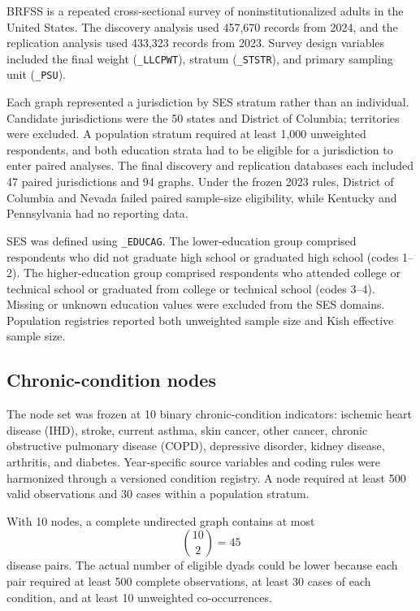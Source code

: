 \documentclass[11pt]{article}
\newcommand{\brfss}{\textsc{BRFSS}}
\begin{document}
\brfss{} is a repeated cross-sectional survey of noninstitutionalized adults
in the United States. The discovery analysis used 457,670 records from 2024,
and the replication analysis used 433,323 records from 2023. Survey design
variables included the final weight (\texttt{\_LLCPWT}), stratum
(\texttt{\_STSTR}), and primary sampling unit (\texttt{\_PSU}).

Each graph represented a jurisdiction by SES stratum rather than an
individual. Candidate jurisdictions were the 50 states and District of
Columbia; territories were excluded. A population stratum required at least
1,000 unweighted respondents, and both education strata had to be eligible for
a jurisdiction to enter paired analyses. The final discovery and replication
databases each included 47 paired jurisdictions and 94 graphs. Under the
frozen 2023 rules, District of Columbia and Nevada failed paired sample-size
eligibility, while Kentucky and Pennsylvania had no reporting data.

SES was defined using \texttt{\_EDUCAG}. The lower-education group comprised
respondents who did not graduate high school or graduated high school
(codes 1--2). The higher-education group comprised respondents who attended
college or technical school or graduated from college or technical school
(codes 3--4). Missing or unknown education values were excluded from the SES
domains. Population registries reported both unweighted sample size and Kish
effective sample size.

\subsection{Chronic-condition nodes}

The node set was frozen at 10 binary chronic-condition indicators:
ischemic heart disease (IHD), stroke, current asthma, skin cancer, other
cancer, chronic obstructive pulmonary disease (COPD), depressive disorder,
kidney disease, arthritis, and diabetes. Year-specific source variables and
coding rules were harmonized through a versioned condition registry. A node
required at least 500 valid observations and 30 cases within a population
stratum.

With 10 nodes, a complete undirected graph contains at most
\begin{equation}
  {10 \choose 2}=45
\end{equation}
disease pairs. The actual number of eligible dyads could be lower because each
pair required at least 500 complete observations, at least 30 cases of each
condition, and at least 10 unweighted co-occurrences.
\end{document}
